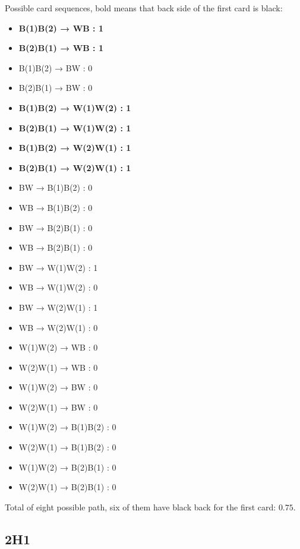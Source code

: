 \documentclass[
]{book}
\begin{document}
Possible card sequences, bold means that back side of the first card is black:

\begin{itemize}
\item
  \textbf{B(1)\textbar B(2) → W\textbar B : 1}
\item
  \textbf{B(2)\textbar B(1) → W\textbar B : 1}
\item
  B(1)\textbar B(2) → B\textbar W : 0
\item
  B(2)\textbar B(1) → B\textbar W : 0
\item
  \textbf{B(1)\textbar B(2) → W(1)\textbar W(2) : 1}
\item
  \textbf{B(2)\textbar B(1) → W(1)\textbar W(2) : 1}
\item
  \textbf{B(1)\textbar B(2) → W(2)\textbar W(1) : 1}
\item
  \textbf{B(2)\textbar B(1) → W(2)\textbar W(1) : 1}
\item
  B\textbar W → B(1)\textbar B(2) : 0
\item
  W\textbar B → B(1)\textbar B(2) : 0
\item
  B\textbar W → B(2)\textbar B(1) : 0
\item
  W\textbar B → B(2)\textbar B(1) : 0
\item
  B\textbar W → W(1)\textbar W(2) : 1
\item
  W\textbar B → W(1)\textbar W(2) : 0
\item
  B\textbar W → W(2)\textbar W(1) : 1
\item
  W\textbar B → W(2)\textbar W(1) : 0
\item
  W(1)\textbar W(2) → W\textbar B : 0
\item
  W(2)\textbar W(1) → W\textbar B : 0
\item
  W(1)\textbar W(2) → B\textbar W : 0
\item
  W(2)\textbar W(1) → B\textbar W : 0
\item
  W(1)\textbar W(2) → B(1)\textbar B(2) : 0
\item
  W(2)\textbar W(1) → B(1)\textbar B(2) : 0
\item
  W(1)\textbar W(2) → B(2)\textbar B(1) : 0
\item
  W(2)\textbar W(1) → B(2)\textbar B(1) : 0
\end{itemize}

Total of eight possible path, six of them have black back for the first card: \(0.75\).

\hypertarget{h1}{%
\subsection*{2H1}\label{h1}}
\end{document}
